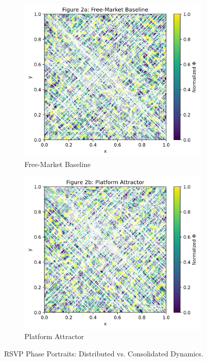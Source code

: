 \documentclass[12pt]{article}
\begin{document}
\begin{figure}[h]
\centering
\begin{subfigure}{0.45\textwidth}
\includegraphics[width=\textwidth]{rsvp_free.png}
\caption{Free-Market Baseline}
\end{subfigure}
\begin{subfigure}{0.45\textwidth}
\includegraphics[width=\textwidth]{rsvp_attractor.png}
\caption{Platform Attractor}
\end{subfigure}
\caption{RSVP Phase Portraits: Distributed vs. Consolidated Dynamics.}
\label{fig:rsvp}
\end{figure}
\end{document}
